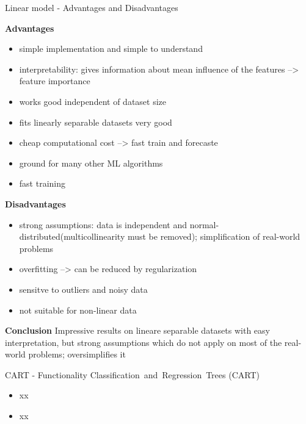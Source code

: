 \documentclass[11pt,compress,t,notes=noshow, xcolor=table]{beamer}
\begin{document}
\begin{frame}{Linear model - Advantages and Disadvantages}

\textbf{Advantages}
\begin{itemize}
\item simple implementation and simple to understand
\item interpretability: gives information about mean influence of the features --> feature importance
\item works good independent of dataset size
\item fits linearly separable datasets very good
\item cheap computational cost --> fast train and forecaste
\item ground for many other ML algorithms
\item fast training
\end{itemize}


\textbf{Disadvantages}
\begin{itemize}
\item strong assumptions: data is independent and normal-distributed(multicollinearity must be removed); simplification of real-world problems
\item overfitting --> can be reduced by regularization
\item sensitve to outliers and noisy data 
\item not suitable for non-linear data
\end{itemize}

\textbf{Conclusion}
Impressive results on lineare separable datasets with easy interpretation, but strong assumptions which do not apply on most of the real-world problems; oversimplifies it

\end{frame}







\begin{frame}{CART - Functionality}
Classification and Regression Trees (CART)
\begin{itemize}
\item xx
\item xx
\end{itemize}


\end{frame}
\end{document}
